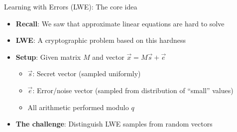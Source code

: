 \documentclass[aspectratio=169, lualatex, handout]{beamer}
\begin{document}
\begin{frame}{Learning with Errors (LWE): The core idea}
	\begin{itemize}
		\item \textbf{Recall}: We saw that approximate linear equations are hard to solve
		\item \textbf{LWE}: A cryptographic problem based on this hardness
		\item \textbf{Setup}: Given matrix $M$ and vector $\vec{x} = M\vec{s} + \vec{e}$
		      \begin{itemize}
			      \item $\vec{s}$: Secret vector (sampled uniformly)
			      \item $\vec{e}$: Error/noise vector (sampled from distribution of ``small'' values)
			      \item All arithmetic performed modulo $q$
		      \end{itemize}
		\item \textbf{The challenge}: Distinguish LWE samples from random vectors
	\end{itemize}
\end{frame}
\end{document}
